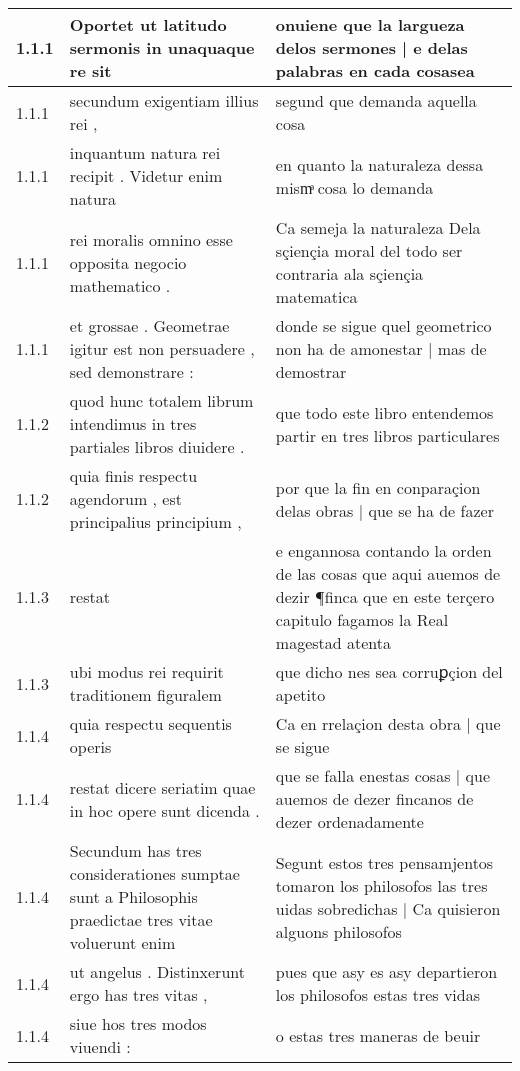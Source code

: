 \begin{tabular}{|p{1cm}|p{6.5cm}|p{6.5cm}|}

\hline
1.1.1 & Oportet ut latitudo sermonis in unaquaque re sit & onuiene que la largueza delos sermones | e delas palabras en cada cosasea \\\hline
1.1.1 & secundum exigentiam illius rei , & segund que demanda aquella cosa \\\hline
1.1.1 & inquantum natura rei recipit . Videtur enim natura & en quanto la naturaleza dessa mismͣ cosa lo demanda \\\hline
1.1.1 & rei moralis omnino esse opposita negocio mathematico . & Ca semeja la naturaleza Dela sçiençia moral del todo ser contraria ala sçiençia matematica \\\hline
1.1.1 & et grossae . Geometrae igitur est non persuadere , sed demonstrare : & donde se sigue quel geometrico non ha de amonestar | mas de demostrar \\\hline
1.1.2 & quod hunc totalem librum intendimus in tres partiales libros diuidere . & que todo este libro entendemos partir en tres libros particulares \\\hline
1.1.2 & quia finis respectu agendorum , est principalius principium , & por que la fin en conparaçion delas obras | que se ha de fazer \\\hline
1.1.3 & restat & e engannosa contando la orden de las cosas que aqui auemos de dezir ¶finca que en este terçero capitulo fagamos la Real magestad atenta \\\hline
1.1.3 & ubi modus rei requirit traditionem figuralem & que dicho nes sea corruꝑçion del apetito \\\hline
1.1.4 & quia respectu sequentis operis & Ca en rrelaçion desta obra | que se sigue \\\hline
1.1.4 & restat dicere seriatim quae in hoc opere sunt dicenda . & que se falla enestas cosas | que auemos de dezer fincanos de dezer ordenadamente \\\hline
1.1.4 & Secundum has tres considerationes sumptae sunt a Philosophis praedictae tres vitae voluerunt enim & Segunt estos tres pensamjentos tomaron los philosofos las tres uidas sobredichas | Ca quisieron alguons philosofos \\\hline
1.1.4 & ut angelus . Distinxerunt ergo has tres vitas , & pues que asy es asy departieron los philosofos estas tres vidas \\\hline
1.1.4 & siue hos tres modos viuendi : & o estas tres maneras de beuir \\\hline

\end{tabular}
